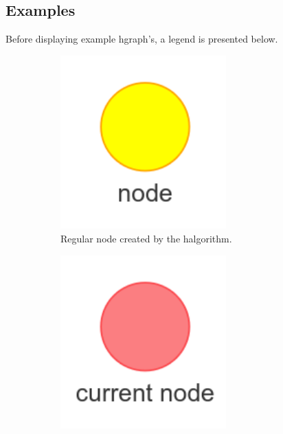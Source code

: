 \subsection{Examples}%
\label{subsec:hgraph_example}

Before displaying example \ac{hgraph}'s, a legend is presented below.\bs

\begin{figure}[H]
    \centering
    \begin{subfigure}{0.2\textwidth}
    \centering
    \includegraphics[width=0.7\textwidth]{figures/proposed_method/connecting_nodes/legend/node}
    \caption{Regular node created by the \ac{halgorithm}.\newline}%
    \end{subfigure}
    \begin{subfigure}{0.2\textwidth}
    \centering
    \includegraphics[width=0.7\textwidth]{figures/proposed_method/connecting_nodes/legend/current_node}

\end{subfigure}
\end{figure}
